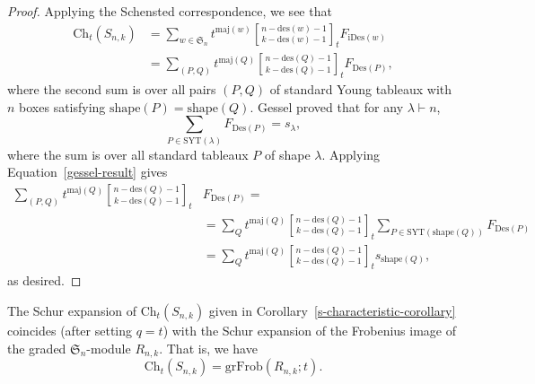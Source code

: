 \documentclass[ALCO,ThmDefs,published]{cedram}
\newcommand{\symm}{{\mathfrak{S}}}
\theoremstyle{plain}
\newcommand{\maj}{{\mathrm {maj}}}
\newcommand{\Des}{{\mathrm {Des}}}
\newcommand{\grFrob}{{\mathrm {grFrob}}}
\newcommand{\des}{{\mathrm {des}}}
\newcommand{\SYT}{{\mathrm {SYT}}}
\newcommand{\Ch}{{\mathrm {Ch}}}
\newcommand{\iDes}{{\mathrm {iDes}}}
\newcommand{\shape}{{\mathrm {shape}}}
\newcommand{\symm}{{\mathfrak{S}}}
\newcommand{\OP}{{\mathcal{OP}}}
\newcommand{\GS}{{\mathcal{GS}}}
\newcommand{\ii}{{\mathbf{i}}}
\begin{document}
\begin{proof}
Applying the Schensted correspondence, we see that
\begin{align}
\Ch_t(S_{n,k}) &= \sum_{w \in \symm_n}  t^{\maj(w)} {n - \des(w) - 1 \brack k - \des(w) - 1}_t F_{\iDes(w)} \\
&= \sum_{(P,Q)} t^{\maj(Q)} {n  - \des(Q) - 1 \brack k - \des(Q) - 1}_t F_{\Des(P)},
\end{align}
where the second sum is over all pairs $(P,Q)$ of standard Young tableaux with $n$ boxes satisfying 
$\shape(P) = \shape(Q)$.
Gessel \cite{Gessel} proved that for any $\lambda \vdash n$,
\begin{equation}
\label{gessel-result}
\sum_{P \in \SYT(\lambda)} F_{\Des(P)} = s_{\lambda},
\end{equation}
where the sum is over all standard tableaux $P$ of shape $\lambda$.
Applying Equation~\eqref{gessel-result} gives
\[\begin{split}
\sum_{(P,Q)} t^{\maj(Q)} {n  - \des(Q) - 1 \brack k - \des(Q) - 1}_t &F_{\Des(P)}=\\
&= \sum_{Q} t^{\maj(Q)} {n  - \des(Q) - 1 \brack k - \des(Q) - 1}_t \sum_{P \in \SYT(\shape(Q))} F_{\Des(P)} \\
&= \sum_Q t^{\maj(Q)} {n  - \des(Q) - 1 \brack k - \des(Q) - 1}_t s_{\shape(Q)},
\end{split}\]
as desired.
\end{proof}

The Schur expansion of $\Ch_t(S_{n,k})$ given in Corollary~\ref{s-characteristic-corollary}
coincides (after setting $q = t$) with the Schur expansion \cite[Cor. 6.13]{HRS} of the Frobenius image
of the graded $\symm_n$-module $R_{n,k}$.  That is, we have
\begin{equation}
\label{rs-coincidence}
\Ch_t(S_{n,k}) = \grFrob(R_{n,k};t).
\end{equation}





\end{document}
